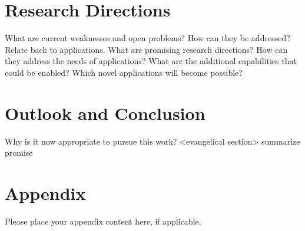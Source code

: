 \begin{bibunit}
\section{Research Directions}
\begin{note}
What are current weaknesses and open problems? How can they be addressed? Relate back to applications.
What are promising research directions? How can they address the needs of applications?
What are the additional capabilities that could be enabled? Which novel applications will become possible?
\end{note}
  
\section{Outlook and Conclusion}
\begin{note}
[up to 3 pages]
Why is it now appropriate to pursue this work?
<evangelical section>
summarize promise
\end{note}
  
  
	\section*{Appendix}\label{appendix}
	
	Please place your appendix content here, if applicable.
	
	
	
	
	
\end{bibunit}
	
%